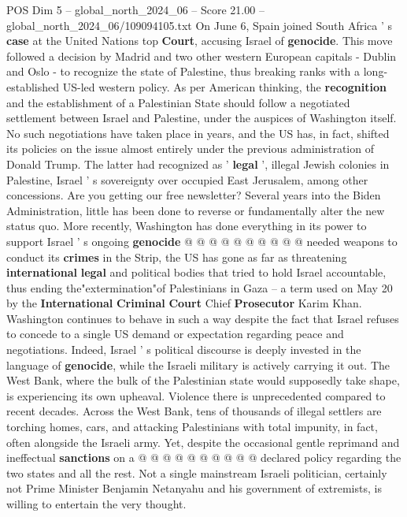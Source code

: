 \begin{textsample}{POS Dim 5 – global\_north\_2024\_06 – Score 21.00 – global\_north\_2024\_06/109094105.txt}  \label{ex:f5_pos_313}
On June 6, Spain joined South Africa ' s \textbf{case} at the United Nations top \textbf{Court}, accusing Israel of \textbf{genocide}.
This move followed a decision by Madrid and two other western European capitals - Dublin and Oslo - to recognize the state of Palestine, thus breaking ranks with a long-established US-led western policy.
As per American thinking, the \textbf{recognition} and the establishment of a Palestinian State should follow a negotiated settlement between Israel and Palestine, under the auspices of Washington itself.
No such negotiations have taken place in years, and the US has, in fact, shifted its policies on the issue almost entirely under the previous administration of Donald Trump.
The latter had recognized as ' \textbf{legal} ', illegal Jewish colonies in Palestine, Israel ' s sovereignty over occupied East Jerusalem, among other concessions.
Are you getting our free newsletter?
Several years into the Biden Administration, little has been done to reverse or fundamentally alter the new status quo.
More recently, Washington has done everything in its power to support Israel ' s ongoing \textbf{genocide} @ @ @ @ @ @ @ @ @ @ needed weapons to conduct its \textbf{crimes} in the Strip, the US has gone as far as threatening \textbf{international} \textbf{legal} and political bodies that tried to hold Israel accountable, thus ending the"extermination"of Palestinians in Gaza -- a term used on May 20 by the \textbf{International} \textbf{Criminal} \textbf{Court} Chief \textbf{Prosecutor} Karim Khan.
Washington continues to behave in such a way despite the fact that Israel refuses to concede to a single US demand or expectation regarding peace and negotiations.
Indeed, Israel ' s political discourse is deeply invested in the language of \textbf{genocide}, while the Israeli military is actively carrying it out.
The West Bank, where the bulk of the Palestinian state would supposedly take shape, is experiencing its own upheaval.
Violence there is unprecedented compared to recent decades.
Across the West Bank, tens of thousands of illegal settlers are torching homes, cars, and attacking Palestinians with total impunity, in fact, often alongside the Israeli army.
Yet, despite the occasional gentle reprimand and ineffectual \textbf{sanctions} on a @ @ @ @ @ @ @ @ @ @ declared policy regarding the two states and all the rest.
Not a single mainstream Israeli politician, certainly not Prime Minister Benjamin Netanyahu and his government of extremists, is willing to entertain the very thought.

\end{textsample}
